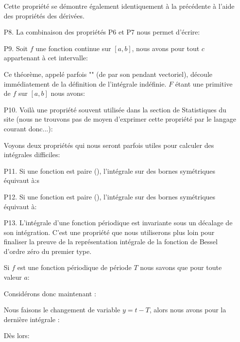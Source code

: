 \begin{enumerate}
		Cette propriété se démontre également identiquement à la précédente à l'aide des propriétés des dérivées.
		
		\item[P8.] La combinaison des propriétés P6 et P7 nous permet d'écrire:
		
		
		\item[P9.] Soit $f$ une fonction continue sur $[a,b]$, nous avons pour tout $c$ appartenant à cet intervalle:
		
		Ce théorème, appelé parfois "" (de par son pendant vectoriel), découle immédiatement de la définition de l'intégrale indéfinie. $F$ étant une primitive de $f$ sur $[a, b]$ nous avons:
		
		
		\item[P10.] Voilà une propriété souvent utilisée dans la section de Statistiques du site (nous ne trouvons pas de moyen d'exprimer cette propriété par le langage courant donc...):
		
		 Voyons deux propriétés qui nous seront parfois utiles pour calculer des intégrales difficiles:
		 
		\item[P11.] Si une fonction est paire (), l'intégrale sur des bornes symétriques équivaut à:s
		
		
		\item[P12.] Si une fonction est paire (), l'intégrale sur des bornes symétriques équivaut à:
		
		
		\item[P13.] L'intégrale d'une fonction périodique est invariante sous un décalage de son intégration. C'est une propriété que nous utiliserons plus loin pour finaliser la preuve de la représentation intégrale de la fonction de Bessel d'ordre zéro du premier type.
	
		Si $f$ est une fonction périodique de période $T$ nous savons que pour toute valeur $a$:
		
		Considérons donc maintenant :
		
		Nous faisons le changement de variable $y=t-T$, alors nous avons pour la dernière intégrale :
		
		Dès lors:
		
	\end{enumerate}
	
	\pagebreak
